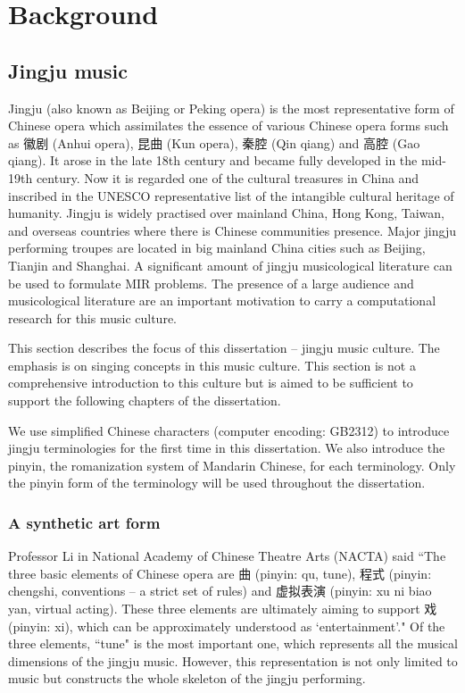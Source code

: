 \chapter{Background}\label{chap:bkgnd}

\section{Jingju music}\label{sec:ch2:jingju_music}
Jingju (also known as Beijing or Peking opera) is the most representative form of Chinese opera which assimilates the essence of various Chinese opera forms such as 徽剧 (Anhui opera), 昆曲 (Kun opera), 秦腔 (Qin qiang) and 高腔 (Gao qiang). It arose in the late 18th century and became fully developed in the mid-19th century. Now it is regarded one of the cultural treasures in China and inscribed in the UNESCO representative list of the intangible cultural heritage of humanity. Jingju is widely practised over mainland China, Hong Kong, Taiwan, and overseas countries where there is Chinese communities presence. Major jingju performing troupes are located in big mainland China cities such as Beijing, Tianjin and Shanghai. A significant amount of jingju musicological literature can be used to formulate MIR problems. The presence of a large audience and musicological literature are an important motivation to carry a computational research for this music culture.

This section describes the focus of this dissertation -- jingju music culture. The emphasis is on singing concepts in this music culture. This section is not a comprehensive introduction to this culture but is aimed to be sufficient to support the following chapters of the dissertation.

We use simplified Chinese characters (computer encoding: GB2312) to introduce jingju terminologies for the first time in this dissertation. We also introduce the pinyin, the romanization system of Mandarin Chinese, for each terminology. Only the pinyin form of the terminology will be used throughout the dissertation. 

\subsection{A synthetic art form}

Professor Li in National Academy of Chinese Theatre Arts (NACTA) said ``The three basic elements of Chinese opera are 曲 (pinyin: qu, tune), 程式 (pinyin: chengshi, conventions -- a strict set of rules) and 虚拟表演 (pinyin: xu ni biao yan, virtual acting). These three elements are ultimately aiming to support 戏 (pinyin: xi), which can be approximately understood as `entertainment'." Of the three elements, ``tune" is the most important one, which represents all the musical dimensions of the jingju music. However, this representation is not only limited to music but constructs the whole skeleton of the jingju performing.

